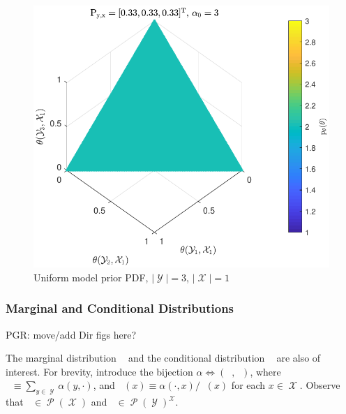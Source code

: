 \documentclass[12pt]{report}
\DeclareMathOperator{\Xcal}{\mathcal{X}}
\DeclareMathOperator{\Ycal}{\mathcal{Y}}
\DeclareMathOperator{\Pcal}{\mathcal{P}}
\DeclareMathOperator{\upthetam}{\uptheta_\text{m}}
\DeclareMathOperator{\upthetac}{\uptheta_\text{c}}
\DeclareMathOperator{\alpham}{\alpha_\text{m}}
\DeclareMathOperator{\alphac}{\alpha_\text{c}}
\begin{document}
\begin{figure}
\centering
\includegraphics[width=0.7\linewidth]{P_theta_uniform.pdf}
\caption{Uniform model prior PDF, $|\Ycal| = 3$, $|\Xcal| = 1$}
\label{fig:P_theta_uniform}
\end{figure}



\subsubsection{Marginal and Conditional Distributions}

PGR: move/add Dir figs here? 

The marginal distribution $\upthetam$ and the conditional distribution $\upthetac$ are also of interest. For brevity, introduce the bijection $\alpha \Leftrightarrow (\alpham,\alphac)$, where $\alpham \equiv \sum_{y \in \Ycal} \alpha(y,\cdot)$, and $\alphac(x) \equiv \alpha(\cdot,x) / \alpham(x)$ for each $x \in \Xcal$. Observe that $\alpham \in \Pcal(\Xcal)$ and $\alphac \in \Pcal(\Ycal)^{\Xcal}$.
\end{document}
